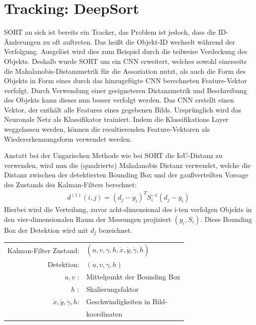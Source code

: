 \documentclass[conference]{IEEEtran}
\begin{document}
	
	\section{Tracking: DeepSort}
	
	SORT an sich ist bereits ein Tracker, das Problem ist jedoch, dass die ID-Änderungen zu oft auftreten. Das heißt die Objekt-ID wechselt während der Verfolgung. Ausgelöst wird dies zum Beispiel durch die teilweise Verdeckung des Objekts. Deshalb wurde SORT um ein CNN erweitert, welches sowohl einerseits die Mahalanobis-Distanzmetrik für die Assoziation nutzt, als auch die Form des Objekts in Form eines durch das hinzugefügte CNN berechneten Feature-Vektor verfolgt. Durch Verwendung einer geeigneteren Distanzmetrik und Beschreibung des Objekts kann dieses nun besser verfolgt werden.
	Das CNN erstellt einen Vektor, der enthält alle Features eines gegebenen Bilds. Ursprünglich wird das Neuronale Netz als Klassifikator trainiert. Indem die Klassifikations Layer weggelassen werden, können die resultierenden Feature-Vektoren als Wiedererkennungsform verwendet werden.
	
	Anstatt bei der Ungarischen Methode wie bei SORT die IoU-Distanz zu verwenden, wird nun die (quadrierte) Mahalanobis Distanz verwendet, welche die Distanz zwischen der detektierten Bounding Box und der gaußverteilten Vorsage des Zustands des Kalman-Filters berechnet:
	\begin{align}
	d^{(1)}(i,j)= (d_j - y_i)^TS^{-1}_i(d_j - y_i)
	\end{align}
	Hierbei wird die Verteilung, zuvor acht-dimensional des i-ten verfolgen Objekts in den vier-dimensionalen Raum der Messungen projiziert $(y_i, S_i)$. Diese Bounding Box der Detektion wird mit $d_j$ bezeichnet. \\
	
	
	\begin{tabular}{r l}
		Kalman-Filter Zustand: & $(u,v,\gamma,h,\dot{x},\dot{y},\dot{\gamma},\dot{h})$ \\
		Detektion: & $(u,v,\gamma,h)$ \\
		$u,v$ :& Mittelpunkt der Bounding Box \\
		$h$ :& Skalierungsfaktor \\
		$\dot{x},\dot{y},\dot{\gamma},\dot{h}$: & Geschwindigkeiten in Bild- \\	
		& koordinaten \\
	\end{tabular} \\
\end{document}
